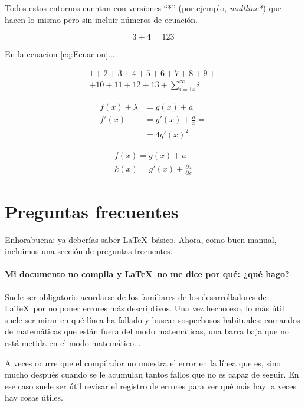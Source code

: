 Todos estos entornos cuentan con versiones ``*'' (por ejemplo, \textit{multline*}) que hacen lo mismo pero sin incluir números de ecuación.

\begin{LTXexample}[pos=r]
\begin{equation} \label{eq:Ecuacion}
3 + 4 = 123
\end{equation}

En la ecuacion \eqref{eq:Ecuacion}...

\begin{multline*}
1 + 2 + 3 + 4 + 5 + 6 + 7 + 8 + 9 + \\
+ 10 + 11 + 12 + 13 + \sum_{i=14}^{\infty} i
\end{multline*}

\begin{align}
f(x) + \lambda &= g(x) + a \\
f'(x) &= g'(x) + \frac{a}{x} = \\
&= 4g'(x)^2
\end{align}

\begin{gather*}
f(x) = g(x) + a \\
k(x) = g'(x) + \frac{\partial a}{\partial x}
\end{gather*}
\end{LTXexample}

\section{Preguntas frecuentes}

Enhorabuena: ya deberías saber \LaTeX\ básico. Ahora, como buen manual, incluimos una sección de preguntas frecuentes.

\paragraph{Mi documento no compila y \LaTeX\ no me dice por qué: ¿qué hago?} Suele ser obligatorio acordarse de los familiares de los desarrolladores de \LaTeX\ por no poner errores más descriptivos. Una vez hecho eso, lo más útil suele ser mirar en qué línea ha fallado y buscar sospechosos habituales: comandos de matemáticas que están fuera del modo matemáticas, una barra baja que no está metida en el modo matemático...

A veces ocurre que el compilador no muestra el error en la línea que es, sino mucho después cuando se le acumulan tantos fallos que no es capaz de seguir. En ese caso suele ser útil revisar el registro de errores para ver qué más hay: a veces hay cosas útiles.

